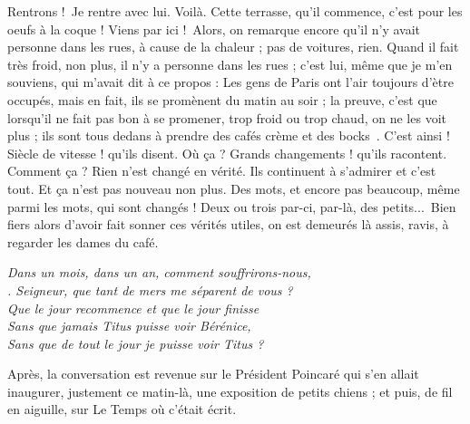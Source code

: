 \documentclass[a4paper,footinbib,final,openany,final,12pt]{book}
\begin{document}
Rentrons !\fg~Je rentre avec lui. Voil{\`{a}}. \og Cette terrasse, qu'il commence, c'est pour les oeufs {\`{a}} la coque ! Viens par ici !\fg~Alors, on remarque encore qu'il n'y avait personne dans les rues, {\`{a}} cause de la chaleur ; pas de voitures, rien. Quand il fait tr{\`{e}}s froid, non plus, il n'y a personne dans les rues ; c'est lui, m{\^{e}}me que je m'en souviens, qui m'avait dit {\`{a}} ce propos : \og Les gens de Paris ont l'air toujours d'{\`{e}}tre occup{\'{e}}s, mais en fait, ils se prom{\`{e}}nent du matin au soir ; la preuve, c'est que lorsqu'il ne fait pas bon {\`{a}} se promener, trop froid ou trop chaud, on ne les voit plus ; ils sont tous dedans {\`{a}} prendre des caf{\'{e}}s cr{\`{e}}me et des bocks~\cite{Discipline}. C'est ainsi ! Si{\`{e}}cle de vitesse ! qu'ils disent. O{\`{u}} {\c{c}}a ? Grands changements ! qu'ils racontent. Comment {\c{c}}a ? Rien n'est chang{\'{e}} en v{\'{e}}rit{\'{e}}. Ils continuent {\`{a}} s'admirer et c'est tout. Et {\c{c}}a n'est pas nouveau non plus. Des mots, et encore pas beaucoup, m{\^{e}}me parmi les mots, qui sont chang{\'{e}}s ! Deux ou trois par-ci, par-l{\`{a}}, des petits...\fg~Bien fiers alors d'avoir fait sonner ces v{\'{e}}rit{\'{e}}s utiles, on est demeur{\'{e}}s l{\`{a}} assis, ravis, {\`{a}} regarder les dames du caf{\'{e}}.
\begin{center}
\emph{ Dans un mois, dans un an, comment souffrirons-nous,\\. Seigneur, que tant de mers me s{\'{e}}parent de vous ?\\Que le jour recommence et que le jour finisse\\
Sans que jamais Titus puisse voir B{\'{e}}r{\'{e}}nice,\\
Sans que de tout le jour je puisse voir Titus ?}
\end{center}

Apr{\`{e}}s, la conversation est revenue sur le Pr{\'{e}}sident Poincar{\'{e}} qui s'en allait inaugurer, justement ce matin-l{\`{a}}, une exposition de petits chiens ; et puis, de fil en aiguille, sur Le Temps o{\`{u}} c'{\'{e}}tait {\'{e}}crit.
\end{document}
